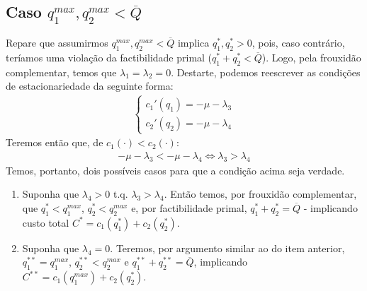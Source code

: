 \subsection{Caso $q_1^{max},q_2^{max}<\overline{Q}$}
Repare que assumirmos $q_1^{max},q_2^{max}<\overline{Q}$ implica $q_1^*,q_2^*>0$, pois, caso contrário, teríamos uma violação da factibilidade primal ($q_1^*+q_2^*<\overline{Q}$). Logo, pela frouxidão complementar, temos que $\lambda_1=\lambda_2=0$. Destarte, podemos reescrever as condições de estacionariedade da seguinte forma:
\begin{align*}
    \begin{cases}
        c_1'(q_1) = -\mu-\lambda_3\\
        c_2'(q_2) = -\mu-\lambda_4
    \end{cases}
\end{align*}
Teremos então que, de $c_1(\cdot)<c_2(\cdot)$:
\begin{align*}
     -\mu-\lambda_3< -\mu-\lambda_4 \Longleftrightarrow \lambda_3>\lambda_4
\end{align*}
Temos, portanto, dois possíveis casos para que a condição acima seja verdade.
\begin{enumerate}
    \item[1)] Suponha que $\lambda_4>0$ t.q. $\lambda_3>\lambda_4$. Então temos, por frouxidão complementar, que $q_1^*<q_1^{max}$, $q_2^*<q_2^{max}$ e, por factibilidade primal, $q_1^*+q_2^*=\overline{Q}$ - implicando custo total $C^* = c_1(q_1^*)+c_2(q_2^*)$. 
    \item[2)] Suponha que $\lambda_4=0$. Teremos, por argumento similar ao do item anterior, $q_1^{**}=q_1^{max}$, $q_2^{**}<q_2^{max}$ e $q_1^{**}+q_2^{**}=\overline{Q}$, implicando $C^{**} = c_1(q_1^{max})+c_2(q_2^*)$.
\end{enumerate}
